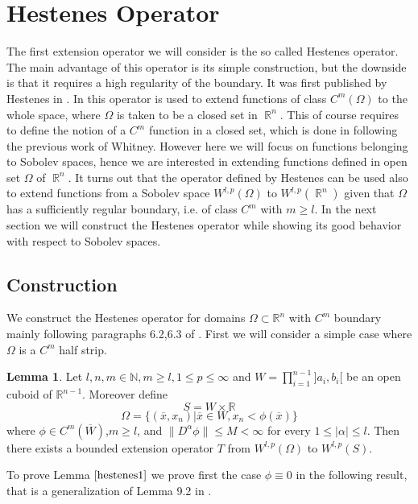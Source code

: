 \documentclass[12pt]{article}
\theoremstyle{definition}
\newtheorem{lemma}{Lemma}
\DeclareMathOperator\rr{\mathbb{R}}
\begin{document}
\section{Hestenes Operator}
The first extension operator we will consider is the so called Hestenes operator. The main advantage of this operator is its simple construction, but the downside is that it requires a high regularity of the boundary. It was first published by Hestenes in \cite{fraenkel}. In \cite{fraenkel} this operator is used to extend functions of class $C^m(\Omega)$ to the whole space, where $\Omega$ is taken to be a closed set in $\rr^n$. This of course requires to define the notion of a $C^m$ function in a closed set, which is done in \cite{fraenkel} following the previous work of Whitney\cite{whitney2}. However here we will focus on functions belonging to Sobolev spaces, hence we are interested in extending functions defined in open set $\Omega$ of $\rr^n.$ It turns out that the operator defined by Hestenes can be used also to extend functions from a Sobolev space $W^{l,p}(\Omega)$ to $W^{l,p}(\rr^n)$ given that $\Omega$ has a sufficiently regular boundary, i.e. of class $C^m$ with $m\ge l$. In the next section we will construct the Hestenes operator while showing its good behavior with respect to Sobolev spaces.

\subsection{Construction}
We construct the Hestenes operator for domains  $\Omega \subset \mathbb{R}^n$ with $C^m$ boundary mainly following paragraphs 6.2,6.3 of \cite{burenkov}. First we will consider a simple case where $\Omega$ is a $C^m$ half strip. 
\begin{lemma}\label{hestenes1}
Let $l,n,m \in \mathbb{N}, m\ge l, 1\le p \le \infty$ and $W = \prod\limits_{i=1}^{n-1}]a_i,b_i[$ be an open cuboid of $\mathbb{R}^{n-1}$. Moreover define
\[ S=W \times \mathbb{R} \]
\[\Omega =\{ (\overline x,x_n) | \overline x\in W, x_n<\phi(\overline x)  \} \]
where $\phi \in C^m(\overline W)$,$m\ge l$, and $\| D^{\alpha}\phi \|\le M <\infty $ for every $1\le|\alpha|\le l$. Then there exists a bounded extension operator $T$ from $W^{l,p}(\Omega)$ to $W^{l,p}(S).$
\end{lemma}





To prove Lemma $\ref{hestenes1}$ we prove first the case $\phi \equiv 0$ in the following result, that is a generalization of Lemma 9.2 in \cite{brezis}.
\end{document}
